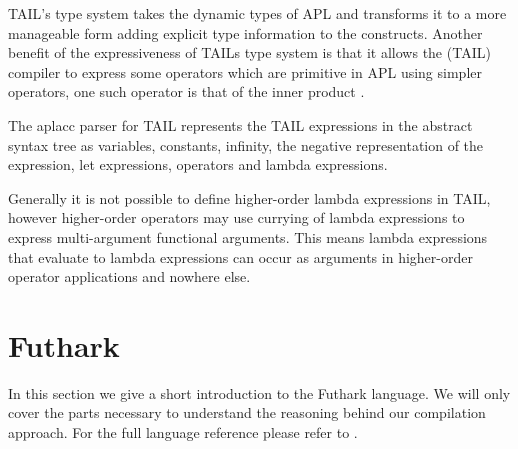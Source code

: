 \documentclass[11pt]{article}
\begin{document}
TAIL's type system takes the dynamic types of APL and transforms it to a more manageable form adding explicit type
information to the constructs.
Another benefit of the expressiveness of TAILs type system is that it allows the (TAIL) compiler to express some operators which
are primitive in APL using simpler operators, one such operator is that of the inner product \cite{ElsmanDybdal:Array:2014}. 

The aplacc parser for TAIL represents the TAIL expressions in the abstract syntax tree as variables, constants, infinity, the negative representation of 
the expression, let expressions, operators and lambda expressions. 


Generally it is not possible to define higher-order lambda expressions in TAIL, however higher-order operators
may use currying of lambda expressions to express multi-argument functional arguments.
This means lambda expressions that evaluate to lambda expressions can occur as arguments in higher-order operator
applications and nowhere else.



\section{Futhark}
\label{sec:futhark}

In this section we give a short introduction to the Futhark language. We will only cover the parts necessary to understand
the reasoning behind our compilation approach. For the full language reference please refer to \cite{TroelsHenriksen}.
\end{document}
